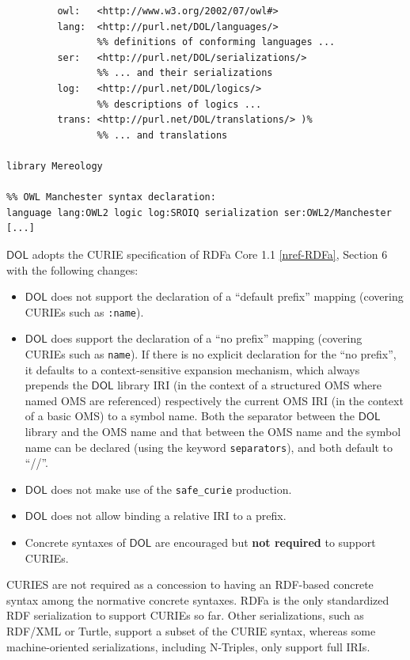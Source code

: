 \documentclass[10pt, a4paper]{isov2}
\makeatletter
\newcommand*\CommentAuthor{}
\renewcommand*\CommentAuthor{#1}}
\newcommand*\CommentDate{}
\renewcommand*\CommentDate{#1}}
\newcommand*\CommentId{}
\renewcommand*\CommentId{#1}}
\newcommand*\CommentType{}
\renewcommand*\CommentType{#1}}
\newcommand*{\SetCommentColorByType}[1]{%
\edef\localType{{#1}}%
\expandafter\ifstrequal\localType{q-aut}{\colorlet{CommentColor}{red}}{%
\expandafter\ifstrequal\localType{q-all}{\colorlet{CommentColor}{orange}}{%
\expandafter\ifstrequal\localType{todo}{\colorlet{CommentColor}{orange}}{%
\expandafter\ifstrequal\localType{fyi}{\colorlet{CommentColor}{lightgray}}{%
\colorlet{CommentColor}{yellow}}}}}}
\newcommand*{\SetCommentPrefixByType}[1]{%
\edef\localType{{#1}}%
\expandafter\@ifmtarg\localType{%
\edef\CommentPrefix{}%
}{%
\caseupper[q]{#1}%
\edef\CommentPrefix{\thestring: }%
}}
\newcommand*{\initComment}[1]{%
\setkeys{Comment}{#1}%
\SetCommentColorByType{\CommentType}%
\relax%
\SetCommentPrefixByType{\CommentType}%
\relax%
}
\newcommand*{\todonote}[2][]{%
\initComment{#1}%
\pdfcomment[author=\CommentAuthor,color=CommentColor,date=\CommentDate,id=\CommentId]{%
\CommentPrefix
#2}}
\renewcommand*{\todonote}[2][]{%
\initComment{#1}%
\ednote{\CommentPrefix #2}}
\newcommand*{\CLnote}[2][author=Christoph Lange]{%
\todonote[author=Christoph Lange,#1]{#2}}
\newcommand*{\syntax}[1]{\texttt{#1}}
\newcommand*{\notrequired}{\textbf{not required}\xspace}
\newcommand*{\DOL}{\ensuremath{\mathsf{DOL}}\xspace}
\renewcommand{\noterefname}{note}
\renewcommand{\nref}[1]{\noterefname~\ref{#1}}
\renewcommand{\nref}[1]{\ref{nref-#1}}
\makeatother
\begin{document}
\begin{lstlisting}[basicstyle=\ttfamily,language=dolText,escapechar=@,mathescape]
%prefix( :      <http://www.example.org/mereology#>
         owl:   <http://www.w3.org/2002/07/owl#>
         lang:  <http://purl.net/DOL/languages/>
                %% definitions of conforming languages ...
         ser:   <http://purl.net/DOL/serializations/>
                %% ... and their serializations
         log:   <http://purl.net/DOL/logics/>
                %% descriptions of logics ...
         trans: <http://purl.net/DOL/translations/> )%
                %% ... and translations

library Mereology

%% OWL Manchester syntax declaration: 
language lang:OWL2 logic log:SROIQ serialization ser:OWL2/Manchester
[...]
\end{lstlisting}


\DOL adopts the CURIE specification of RDFa Core 1.1 \nref{RDFa}, Section 6 with the following changes:
 \begin{itemize} 
\item \DOL does not support the declaration of a ``default prefix'' mapping %
(covering CURIEs such as \syntax{:name}).
\item \DOL does support the declaration  of a ``no prefix'' mapping (covering CURIEs such as 
\syntax{name}). If there is no explicit declaration for the ``no prefix'', it defaults to a 
context-sensitive expansion mechanism, which always prepends the \DOL library IRI (in the context of a 
structured OMS where named OMS are referenced) respectively the current OMS IRI (in the context of a basic
OMS) to a symbol name. Both the separator between the \DOL library and the OMS name and that between the 
OMS name and the symbol name can be declared (using the keyword \syntax{separators}), and both default to ``//''.

\item \DOL does not make use of the \syntax{safe\_curie} production.
\item \DOL does not allow binding a relative IRI to a prefix.
\item Concrete syntaxes of \DOL are encouraged but \notrequired to support CURIEs.
 \end{itemize} 

{CURIES are not required as 
a concession to having an RDF-based concrete syntax among the normative concrete syntaxes.  RDFa is 
the only standardized RDF serialization to support CURIEs so far.  Other serializations, such as 
RDF/XML or Turtle, support a subset of the CURIE syntax, whereas some machine-oriented 
serializations, including N-Triples, only support full IRIs.}
\end{document}
